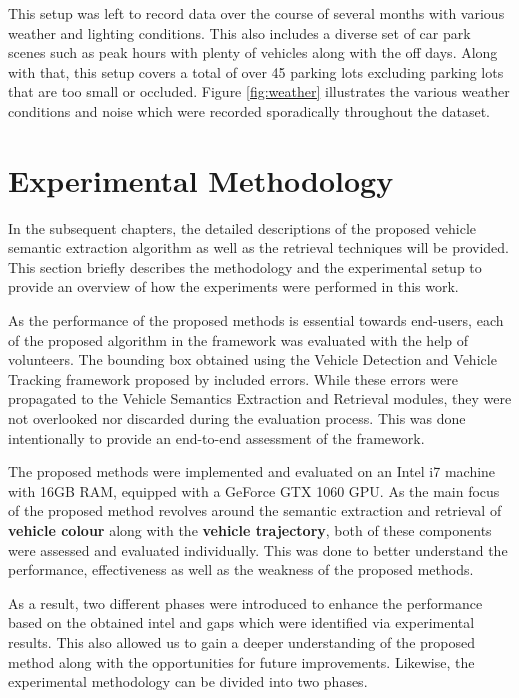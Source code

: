 This setup was left to record data over the course of several months with various weather and lighting conditions. This also includes a diverse set of car park scenes such as peak hours with plenty of vehicles along with the off days. Along with that, this setup covers a total of over 45 parking lots excluding parking lots that are too small or occluded. Figure \ref{fig:weather} illustrates the various weather conditions and noise which were recorded sporadically throughout the dataset.


\section{Experimental Methodology}
\label{sec:expmethodology}

In the subsequent chapters, the detailed descriptions of the proposed vehicle semantic extraction algorithm as well as the retrieval techniques will be provided. This section briefly describes the methodology and the experimental setup to provide an overview of how the experiments were performed in this work.

As the performance of the proposed methods is essential towards end-users, each of the proposed algorithm in the framework was evaluated with the help of volunteers.
The bounding box obtained using the Vehicle Detection and Vehicle Tracking framework proposed by \cite{lim2017} included errors. While these errors were propagated to the Vehicle Semantics Extraction and Retrieval modules, they were not overlooked nor discarded during the evaluation process. This was done intentionally to provide an end-to-end assessment of the framework.

The proposed methods were implemented and evaluated on an Intel i7 machine with 16GB RAM, equipped with a GeForce GTX 1060 GPU. As the main focus of the proposed method revolves around the semantic extraction and retrieval of \textbf{vehicle colour} along with the \textbf{vehicle trajectory}, both of these components were assessed and evaluated individually.
This was done to better understand the performance, effectiveness as well as the weakness of the proposed methods.

As a result, two different phases were introduced to enhance the performance based on the obtained intel and gaps which were identified via experimental results. This also allowed us to gain a deeper understanding of the proposed method along with the opportunities for future improvements.
Likewise, the experimental methodology can be divided into two phases.


